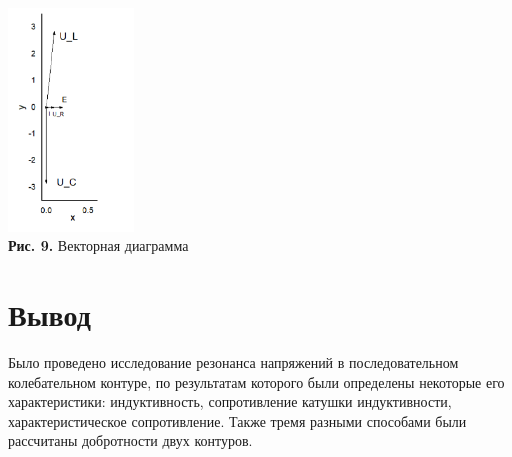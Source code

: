 \documentclass[a4paper,12pt]{article} %
\begin{document}
\begin{center}
\includegraphics[width=0.25\textwidth]{3.2.2_9.png}\\
\textbf{Рис. 9.} Векторная диаграмма \\
\end{center}

\section{Вывод}
\hfill \break Было проведено исследование резонанса напряжений в последовательном колебательном контуре, по результатам которого были определены некоторые его характеристики: индуктивность, сопротивление катушки индуктивности, характеристическое сопротивление. Также тремя разными способами были рассчитаны добротности двух контуров.
\end{document}
